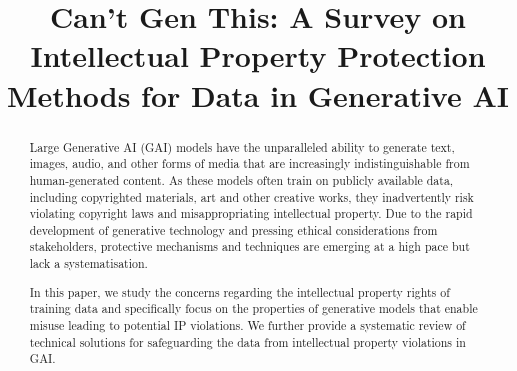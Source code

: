 \documentclass[conference]{IEEEtran}
\title{Can't Gen This: A Survey on Intellectual Property Protection Methods for Data in Generative AI}
\author{
    \IEEEauthorblockN{Tanja Šarčević}
    \IEEEauthorblockA{\textit{SBA Research},
        Vienna, Austria\\
        tsarcevic@sba-research.org
    }
\and
    \IEEEauthorblockN{Alicja Karlowicz}
    \IEEEauthorblockA{\textit{SBA Research},
        Vienna, Austria\\
        akarlowicz@sba-research.org
    }
\and
    \IEEEauthorblockN{Rudolf Mayer}
    \IEEEauthorblockA{\textit{SBA Research},
        Vienna, Austria\\
        rmayer@sba-research.org
    }
\and
    \IEEEauthorblockN{Ricardo Baeza-Yates}
    \IEEEauthorblockA{\textit{Northeastern University},
        Boston, MA, USA\\
        ricardo.baeza@upf.edu
    }
\and
    \IEEEauthorblockN{Andreas Rauber}
    \IEEEauthorblockA{\textit{TU Wien},
        Vienna, Austria\\
        andreas.rauber@tuwien.ac.at
    }
}
\begin{document}
\maketitle
\thispagestyle{plain}
\pagestyle{plain}

\begin{abstract}
Large Generative AI (GAI) models have the unparalleled ability to generate text, images, audio, and other forms of media that are increasingly indistinguishable from human-generated content.
As these models often train on publicly available data, including copyrighted materials, art and other creative works, they inadvertently risk violating copyright laws and misappropriating intellectual property.
Due to the rapid development of generative technology and pressing ethical considerations from stakeholders, protective mechanisms and techniques are emerging at a high pace but lack a systematisation.

In this paper, we study the concerns regarding the intellectual property rights of training data and specifically focus on the properties of generative models that enable misuse leading to potential IP violations. We further provide a systematic review of technical solutions for safeguarding the data from intellectual property violations in GAI.

  
\end{abstract}
\end{document}
